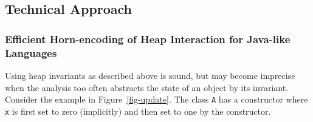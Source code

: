 \subsection{Technical Approach}
\label{sec-extension}

\newcommand{\true}{\ensuremath{\mathsf{true}}\xspace}
\newcommand{\false}{\ensuremath{\mathsf{false}}\xspace}

\newcommand{\smallpar}[1]{\medskip\noindent\emph{#1}:}

\newcommand{\expr}{\ensuremath{\textit{t}}\xspace}
\newcommand{\lvar}{\ensuremath{\textit{x}}\xspace}
\newcommand{\lvarp}{\ensuremath{\textit{y}}\xspace}
\newcommand{\pvar}{\ensuremath{\textit{p}}\xspace}
\newcommand{\qvar}{\ensuremath{\textit{q}}\xspace}
\newcommand{\cvar}{\ensuremath{\textit{c}}\xspace}

\newcommand{\fvar}{\ensuremath{\textit{f}}\xspace}

\newtheorem{theorem}{Theorem}[section]
\newtheorem{lemma}[theorem]{Lemma}





\subsubsection{Efficient Horn-encoding of Heap Interaction for Java-like Languages}
Using heap invariants as described above is sound, but may become imprecise 
when the analysis too often abstracts the state of an object by its invariant.
Consider the example in Figure~\ref{fig-update}. The class \texttt{A} has a 
constructor where \texttt{x} is first set to zero (implicitly) and then
set to one by the constructor. 


